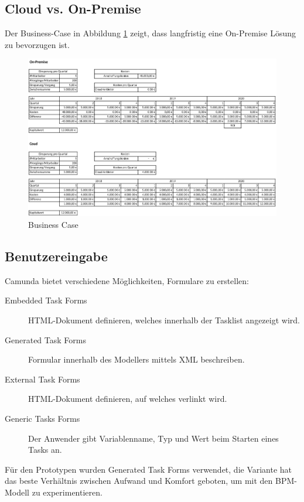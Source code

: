 \subsection{Cloud vs. On-Premise}

Der Business-Case in Abbildung \ref{fig:business-case} zeigt, dass langfristig eine On-Premise Lösung zu bevorzugen ist.

\begin{figure}
  \centering
  \includegraphics{images/business-case.png}
  \caption{Business Case}
  \label{fig:business-case}
\end{figure}

\subsection{Benutzereingabe}

Camunda bietet verschiedene Möglichkeiten, Formulare zu erstellen:
\begin{description}
  \item[Embedded Task Forms] HTML-Dokument definieren, welches innerhalb der Tasklist angezeigt wird.
  \item [Generated Task Forms] Formular innerhalb des Modellers mittels XML beschreiben.
  \item[External Task Forms] HTML-Dokument definieren, auf welches verlinkt wird.
  \item [Generic Tasks Forms] Der Anwender gibt Variablenname, Typ und Wert beim Starten eines Tasks an.
\end{description}

Für den Prototypen wurden Generated Task Forms verwendet, die Variante hat das beste Verhältnis zwischen Aufwand und Komfort geboten, um mit den BPM-Modell zu experimentieren.

